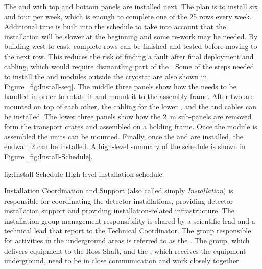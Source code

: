 The  and  with top and bottom  panels are
installed next. The plan is to install six  and four
 per week, which is enough to complete one of the \num{25}
rows every week. Additional time is built into the schedule to take
into account that the installation will be slower at the beginning and
some re-work may be needed. By building west-to-east, complete rows can
be finished and tested before moving to the next row. This reduces the
risk of finding a fault after final  deployment and cabling,
which would require dismantling part of the . Some of the steps
needed to install the  and  modules outside the
cryostat are also shown in Figure~\ref{fig:Install-seq}.  The middle three
panels show how the  needs to be handled in order to rotate
it and mount it to the assembly frame. After two  are
mounted on top of each other, the cabling for the lower , and the
 and  cables can be installed. The
lower three panels show how the \SI{2}{m}  sub-panels are
removed form the transport crates and assembled on a holding frame. Once
the  module is assembled the  units can be
mounted. Finally, once the  and  are installed,
the endwall~2 can be installed. A high-level summary of the schedule
is shown in Figure~\ref{fig:Install-Schedule}.

\begin{dunefigure}{fig:Install-Schedule}
  {High-level installation schedule.}
\end{dunefigure}


 Installation Coordination and Support %
(also called simply \textit{Installation}) is
responsible for coordinating the detector installations, providing
detector installation support and providing installation-related
infrastructure. The installation group management responsibility is
shared by a scientific lead and a technical lead that report to the
Technical Coordinator. The %
group responsible for activities in the underground areas is referred to as
the . The  group, which delivers equipment to the
Ross Shaft, and the , which receives the equipment
underground, need to be in close communication and work closely
together.

